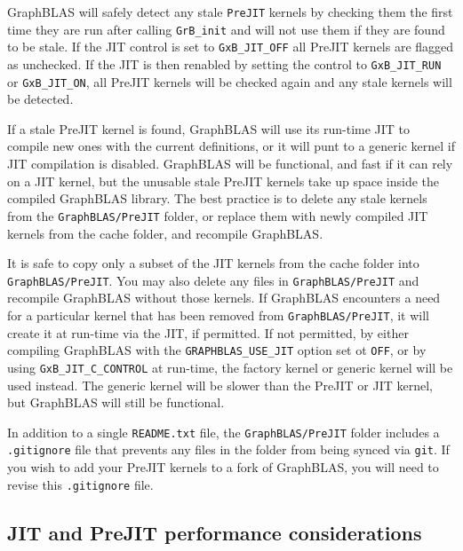 GraphBLAS will safely detect any stale \verb'PreJIT' kernels by checking them
the first time they are run after calling \verb'GrB_init' and will not use them
if they are found to be stale.  If the JIT control is set to \verb'GxB_JIT_OFF'
all PreJIT kernels are flagged as unchecked.  If the JIT is then renabled by
setting the control to \verb'GxB_JIT_RUN' or \verb'GxB_JIT_ON', all PreJIT
kernels will be checked again and any stale kernels will be detected.

If a stale PreJIT kernel is found, GraphBLAS will use its run-time JIT to
compile new ones with the current definitions, or it will punt to a generic
kernel if JIT compilation is disabled.  GraphBLAS will be functional, and fast
if it can rely on a JIT kernel, but the unusable stale PreJIT kernels take up
space inside the compiled GraphBLAS library.  The best practice is to delete
any stale kernels from the \verb'GraphBLAS/PreJIT' folder, or replace them with
newly compiled JIT kernels from the cache folder, and recompile GraphBLAS.

It is safe to copy only a subset of the JIT kernels from the cache folder into
\verb'GraphBLAS/PreJIT'.  You may also delete any files in
\verb'GraphBLAS/PreJIT' and recompile GraphBLAS without those kernels.  If
GraphBLAS encounters a need for a particular kernel that has been removed from
\verb'GraphBLAS/PreJIT', it will create it at run-time via the JIT, if
permitted.  If not permitted, by either compiling GraphBLAS with the
\verb'GRAPHBLAS_USE_JIT' option set ot \verb'OFF', or by using
\verb'GxB_JIT_C_CONTROL' at run-time, the factory kernel or generic kernel will
be used instead.  The generic kernel will be slower than the PreJIT or JIT
kernel, but GraphBLAS will still be functional.

In addition to a single \verb'README.txt' file, the \verb'GraphBLAS/PreJIT'
folder includes a \verb'.gitignore' file that prevents any files in the folder
from being synced via \verb'git'.  If you wish to add your PreJIT kernels to a
fork of GraphBLAS, you will need to revise this \verb'.gitignore' file.

\subsection{{\sf JIT} and {\sf PreJIT} performance considerations}
\label{jit_performance}

